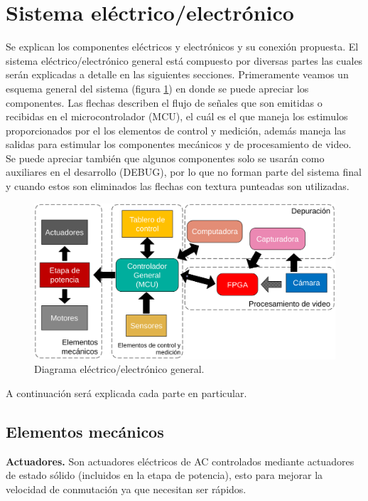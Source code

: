 \documentclass[twoside,spanish,ESP,MSc]{plantillaLabUPV}
\theoremstyle{definition}
\begin{document}
\section{Sistema eléctrico/electrónico}
Se explican los componentes eléctricos y electrónicos y su conexión propuesta. El sistema eléctrico/electrónico general está compuesto por diversas partes las cuales serán explicadas a detalle en las siguientes secciones. Primeramente veamos un esquema general del sistema (figura \ref{fig:diagramagralelectrico}) en donde se puede apreciar los componentes. Las flechas describen el flujo de señales que son emitidas o recibidas en el microcontrolador (MCU), el cuál es el que maneja los estimulos proporcionados por el los elementos de control y medición, además maneja las salidas para estimular los componentes mecánicos y de procesamiento de video. Se puede apreciar también que algunos componentes solo se usarán como auxiliares en el desarrollo (DEBUG), por lo que no forman parte del sistema final y cuando estos son eliminados las flechas con textura punteadas son utilizadas.

\begin{figure}[h]
	\centering
	\includegraphics[scale=0.28]{edrawimas/diagramagralelectrico}
	\caption{Diagrama eléctrico/electrónico general.}
	\label{fig:diagramagralelectrico}
\end{figure}

A continuación será explicada cada parte en particular.


\subsection{Elementos mecánicos}
\checkmark\textbf{Actuadores.} Son actuadores eléctricos de AC controlados mediante actuadores de estado sólido (incluidos en la etapa de potencia), esto para mejorar la velocidad de conmutación ya que necesitan ser rápidos.
\end{document}
